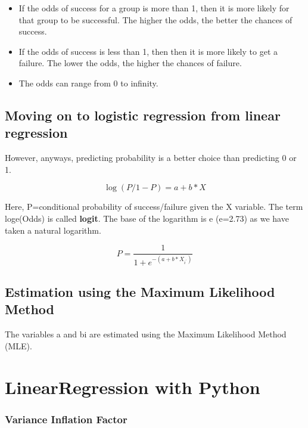 \documentclass{article}
\numberwithin{equation}{section} %
\begin{document}
\begin{itemize}
	\item If the odds of success for a group is more than 1, then it is more likely for that group to be successful. The higher the odds, the better the chances of success.
	\item If the odds of success is less than 1, then then it is more likely to get a failure. The lower the odds, the higher the chances of failure.
	\item The odds can range from 0 to infinity.
\end{itemize}


\subsection*{Moving on to logistic regression from linear regression}

However, anyways, predicting probability is a better choice than predicting 0 or 1.

\begin{equation*}
\log( P /1 - P) = a + b \ast X
\end{equation*}

Here, P=conditional probability of success/failure given the X variable. The term loge(Odds) is called \textbf{logit}. The base of the logarithm is e (e=2.73) as we have taken a natural logarithm.

\begin{equation*}
P = \frac{1}{1+e^{-(a+b\ast X_{i^\prime})}}
\end{equation*}


\subsection*{Estimation using the Maximum Likelihood Method}

The variables a and bi are estimated using the Maximum Likelihood Method (MLE).






\newpage

\section*{LinearRegression with Python}

\subsubsection*{Variance Inflation Factor}
\end{document}
